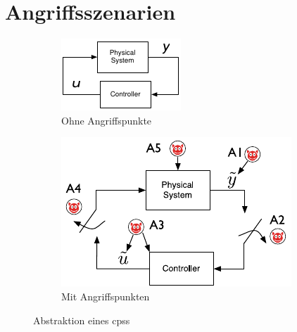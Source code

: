 \documentclass[final,bibliography=totocnumbered]{include/sikseminar}
\newcommand{\cps}{\glspl{cps}\xspace}
\begin{document}
    \section{Angriffsszenarien}
    \label{sec:angriffszenarien}
    \begin{figure}
        \centering
        \begin{subfigure}[b]{0.3\textwidth}
            \includegraphics[width=\textwidth]{abstrakt}
            \caption{Ohne Angriffspunkte}
            \label{fig:abstrakt}
        \end{subfigure}
        \qquad
        \begin{subfigure}[b]{0.4\textwidth}
            \includegraphics[width=\textwidth]{attack_points}
            \caption{Mit Angriffspunkten}
            \label{fig:attack_points}
        \end{subfigure}
        \caption{Abstraktion eines \cps~\cite{CAS08}}
    \end{figure}
\end{document}
